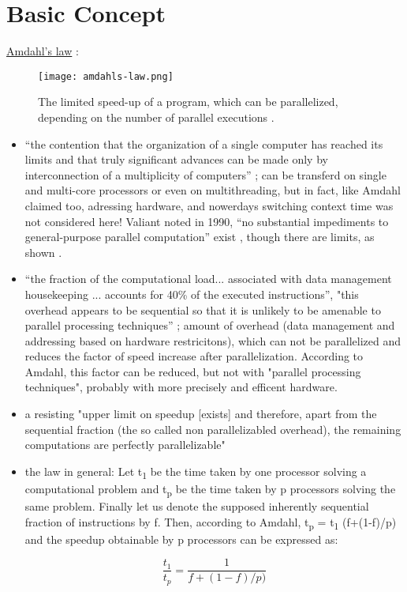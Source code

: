 \section{Basic Concept}

\underline{Amdahl's law} \parencite{book6}:

\begin{figure}[h!]
	\centering
	\texttt{[image: amdahls-law.png]}
	\caption{
		The limited speed-up of a program, which can be parallelized, depending on the number of parallel executions \parencite{image1}.
	}
	\label{fig:admLaw}
\end{figure}

\begin{itemize}
\item “the contention that the organization of a single computer has reached its limits and that
truly significant advances can be made only by interconnection of a multiplicity of computers” \parencite[see][p80]{inbook1}; can be transferd on single and multi-core processors or even on multithreading, but in fact, like Amdahl claimed too, adressing hardware, and nowerdays switching context time was not considered here!
Valiant noted in 1990, “no substantial impediments to general-purpose parallel
computation” exist \parencite[see][p85]{inbook1}, though there are limits, as shown \parencite[seein Sec. 10][p85]{inbook1}.

\newpage

\item “the fraction of the computational load... associated with data management housekeeping ... accounts for 40\% of the executed instructions”, "this overhead appears to be sequential so that it is unlikely to be amenable to parallel processing techniques” \parencite[see][p80]{inbook1}; amount of overhead (data management and addressing based on hardware restricitons), which can not be parallelized and reduces the factor of speed increase after parallelization. According to Amdahl, this factor can be reduced, but not with "parallel processing techniques", probably with more precisely and efficent hardware.
\item a resisting "upper limit on speedup [exists] and therefore, apart from the sequential fraction (the so called non parallelizabled overhead), the remaining computations are perfectly parallelizable" \parencite[see][p81]{inbook1}
\item the law in general: Let t\textsubscript{1} be the time taken by one processor solving a computational problem and t\textsubscript{p} be the time taken by p processors solving the same problem. Finally let us denote the supposed inherently sequential fraction of instructions by f. Then, according to Amdahl, t\textsubscript{p} = t\textsubscript{1} (f+(1-f)/p) and the speedup obtainable by p processors can be expressed as:

	
\[ \frac{t_1}{t_p} = \frac{1}{f + (1 - f) / p)} \]
\end{itemize}

